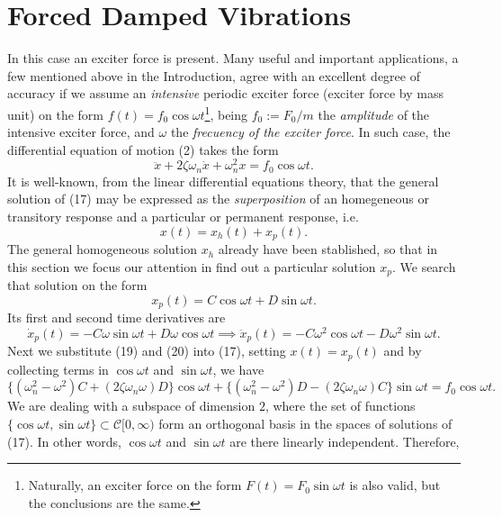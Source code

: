 \documentclass[12pt]{article}
\begin{document}
\section{Forced Damped Vibrations}
In this case an exciter force is present. Many useful and important applications, a few mentioned above in the Introduction, agree with an excellent degree of accuracy if we assume an \emph{intensive} periodic exciter force (exciter force by mass unit) on the form $f(t)=f_0\cos\omega t${\footnote{Naturally, an exciter force on the form $F(t)=F_0\sin\omega t$ is also valid, but the conclusions are the same.}}, being $f_0:=F_0/m$ the \emph{amplitude} of the intensive exciter force, and $\omega$ the \emph{frecuency of the exciter force}. In such case, the differential equation of motion (2) takes the form
\begin{equation}
\ddot{x}+2\zeta\omega_n\dot{x}+\omega_n^2 x=f_0\cos\omega t.
\end{equation} 
It is well-known, from the linear differential equations theory, that the general solution of (17) may be expressed as the \emph{superposition} of an homegeneous or transitory response and a particular or permanent response, i.e.
\begin{equation}
x(t)=x_h(t)+x_p(t).
\end{equation}
The general homogeneous solution $x_h$ already have been stablished, so that in this section we focus our attention in find out a particular solution $x_p$. We search that solution on the form
\begin{equation}
x_p(t)=C\cos\omega t+D\sin\omega t.
\end{equation}
Its first and second time derivatives are
\begin{equation}
\dot{x}_p(t)=-C\omega\sin\omega t+D\omega\cos\omega t\implies\ddot{x}_p(t)=-C\omega^2\cos\omega t-D\omega^2\sin\omega t.
\end{equation}
Next we substitute (19) and (20) into (17), setting $x(t)=x_p(t)$ and  by collecting terms in $\cos\omega t$ and 
$\sin\omega t$, we have
\begin{equation*}
\{(\omega_n^2-\omega^2)C+(2\zeta\omega_n\omega)D\}\cos\omega t+
\{(\omega_n^2-\omega^2)D-(2\zeta\omega_n\omega)C\}\sin\omega t=f_0\cos\omega t.
\end {equation*}
We are dealing with a subspace of dimension $2$, where the set of functions 
$\{\cos\omega t, \sin\omega t\}\subset\mathcal{C}[0, \infty)$ 
form an orthogonal basis in the spaces of solutions of (17). 
In other words, $\cos\omega t$ and $\sin\omega t$ are there linearly independent. Therefore,
\end{document}
